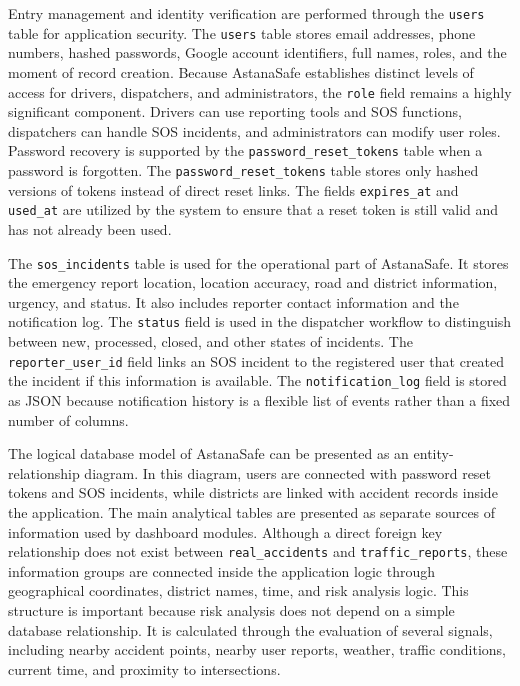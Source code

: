 ﻿\documentclass[12pt,a4paper]{report}
\begin{document}
Entry management and identity verification are performed through the \texttt{users} table for application security. The \texttt{users} table stores email addresses, phone numbers, hashed passwords, Google account identifiers, full names, roles, and the moment of record creation. Because AstanaSafe establishes distinct levels of access for drivers, dispatchers, and administrators, the \texttt{role} field remains a highly significant component. Drivers can use reporting tools and SOS functions, dispatchers can handle SOS incidents, and administrators can modify user roles. Password recovery is supported by the \texttt{password\_reset\_tokens} table when a password is forgotten. The \texttt{password\_reset\_tokens} table stores only hashed versions of tokens instead of direct reset links. The fields \texttt{expires\_at} and \texttt{used\_at} are utilized by the system to ensure that a reset token is still valid and has not already been used.

The \texttt{sos\_incidents} table is used for the operational part of AstanaSafe. It stores the emergency report location, location accuracy, road and district information, urgency, and status. It also includes reporter contact information and the notification log. The \texttt{status} field is used in the dispatcher workflow to distinguish between new, processed, closed, and other states of incidents. The \texttt{reporter\_user\_id} field links an SOS incident to the registered user that created the incident if this information is available. The \texttt{notification\_log} field is stored as JSON because notification history is a flexible list of events rather than a fixed number of columns.

The logical database model of AstanaSafe can be presented as an entity-relationship diagram. In this diagram, users are connected with password reset tokens and SOS incidents, while districts are linked with accident records inside the application. The main analytical tables are presented as separate sources of information used by dashboard modules. Although a direct foreign key relationship does not exist between \texttt{real\_accidents} and \texttt{traffic\_reports}, these information groups are connected inside the application logic through geographical coordinates, district names, time, and risk analysis logic. This structure is important because risk analysis does not depend on a simple database relationship. It is calculated through the evaluation of several signals, including nearby accident points, nearby user reports, weather, traffic conditions, current time, and proximity to intersections.
\end{document}

